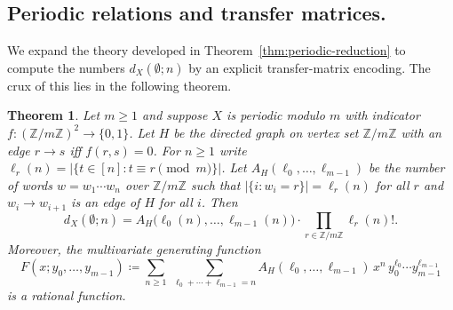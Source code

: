 \documentclass[12pt]{amsart}
\newtheorem{theorem}{Theorem}[section]
\theoremstyle{definition}
\theoremstyle{remark}
\newcommand{\Z}{\mathbb{Z}}
\newcommand{\abs}[1]{\left|#1\right|}
\begin{document}
\subsection{Periodic relations and transfer matrices.}
We expand the theory developed in Theorem~\ref{thm:periodic-reduction} to compute the numbers $d_X(\emptyset;n)$ by an explicit transfer-matrix encoding. The crux of this lies in the following theorem.

\begin{theorem}\label{thm:quasipolynomial}
Let $m\ge 1$ and suppose $X$ is periodic modulo $m$ with indicator $f:(\Z/m\Z)^2\to\{0,1\}$.
Let $H$ be the directed graph on vertex set $\Z/m\Z$ with an edge $r\to s$ iff $f(r,s)=0$.
For $n\ge 1$ write $\ell_r(n)=\abs{\{t\in[n]:t\equiv r\pmod m\}}$.
Let $A_H(\ell_0,\dots,\ell_{m-1})$ be the number of words $w=w_1\cdots w_n$ over $\Z/m\Z$ such that $\abs{\{i:w_i=r\}}=\ell_r(n)$ for all $r$ and $w_i\to w_{i+1}$ is an edge of $H$ for all $i$.
Then
\begin{equation}\label{eq:HKcore}
d_X(\emptyset;n)=A_H\!\bigl(\ell_0(n),\dots,\ell_{m-1}(n)\bigr)\cdot \prod_{r\in\Z/m\Z}\ell_r(n)!.
\end{equation}
Moreover, the multivariate generating function
\[
F(x;y_0,\dots,y_{m-1})
\coloneqq
\sum_{n\ge 1}\ \sum_{\ell_0+\cdots+\ell_{m-1}=n}
A_H(\ell_0,\dots,\ell_{m-1})\,
x^n\,y_0^{\ell_0}\cdots y_{m-1}^{\ell_{m-1}}
\]
is a rational function.
\end{theorem}
\end{document}
